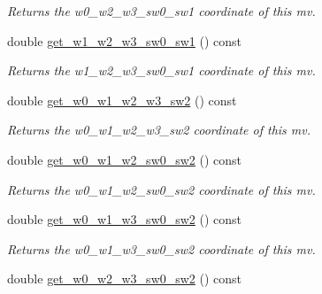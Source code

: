 \begin{DoxyCompactItemize}
\begin{DoxyCompactList}\small\item\em Returns the w0\-\_\-w2\-\_\-w3\-\_\-sw0\-\_\-sw1 coordinate of this mv. \end{DoxyCompactList}\item 
\hypertarget{classe3ga_1_1mv_a881ff0b4de5764df3f79668ca94bd436}{double \hyperlink{classe3ga_1_1mv_a881ff0b4de5764df3f79668ca94bd436}{get\-\_\-w1\-\_\-w2\-\_\-w3\-\_\-sw0\-\_\-sw1} () const }\label{classe3ga_1_1mv_a881ff0b4de5764df3f79668ca94bd436}

\begin{DoxyCompactList}\small\item\em Returns the w1\-\_\-w2\-\_\-w3\-\_\-sw0\-\_\-sw1 coordinate of this mv. \end{DoxyCompactList}\item 
\hypertarget{classe3ga_1_1mv_a1c7613f6888f421e383d786bbdb3ba01}{double \hyperlink{classe3ga_1_1mv_a1c7613f6888f421e383d786bbdb3ba01}{get\-\_\-w0\-\_\-w1\-\_\-w2\-\_\-w3\-\_\-sw2} () const }\label{classe3ga_1_1mv_a1c7613f6888f421e383d786bbdb3ba01}

\begin{DoxyCompactList}\small\item\em Returns the w0\-\_\-w1\-\_\-w2\-\_\-w3\-\_\-sw2 coordinate of this mv. \end{DoxyCompactList}\item 
\hypertarget{classe3ga_1_1mv_a81ae1068e1fb3459368717580703ad42}{double \hyperlink{classe3ga_1_1mv_a81ae1068e1fb3459368717580703ad42}{get\-\_\-w0\-\_\-w1\-\_\-w2\-\_\-sw0\-\_\-sw2} () const }\label{classe3ga_1_1mv_a81ae1068e1fb3459368717580703ad42}

\begin{DoxyCompactList}\small\item\em Returns the w0\-\_\-w1\-\_\-w2\-\_\-sw0\-\_\-sw2 coordinate of this mv. \end{DoxyCompactList}\item 
\hypertarget{classe3ga_1_1mv_ad1d07477fde190958bfd2f22c19965c8}{double \hyperlink{classe3ga_1_1mv_ad1d07477fde190958bfd2f22c19965c8}{get\-\_\-w0\-\_\-w1\-\_\-w3\-\_\-sw0\-\_\-sw2} () const }\label{classe3ga_1_1mv_ad1d07477fde190958bfd2f22c19965c8}

\begin{DoxyCompactList}\small\item\em Returns the w0\-\_\-w1\-\_\-w3\-\_\-sw0\-\_\-sw2 coordinate of this mv. \end{DoxyCompactList}\item 
\hypertarget{classe3ga_1_1mv_a28c98c9e0e242ad60747f2b04d8258d5}{double \hyperlink{classe3ga_1_1mv_a28c98c9e0e242ad60747f2b04d8258d5}{get\-\_\-w0\-\_\-w2\-\_\-w3\-\_\-sw0\-\_\-sw2} () const }\label{classe3ga_1_1mv_a28c98c9e0e242ad60747f2b04d8258d5}


\end{DoxyCompactItemize}
